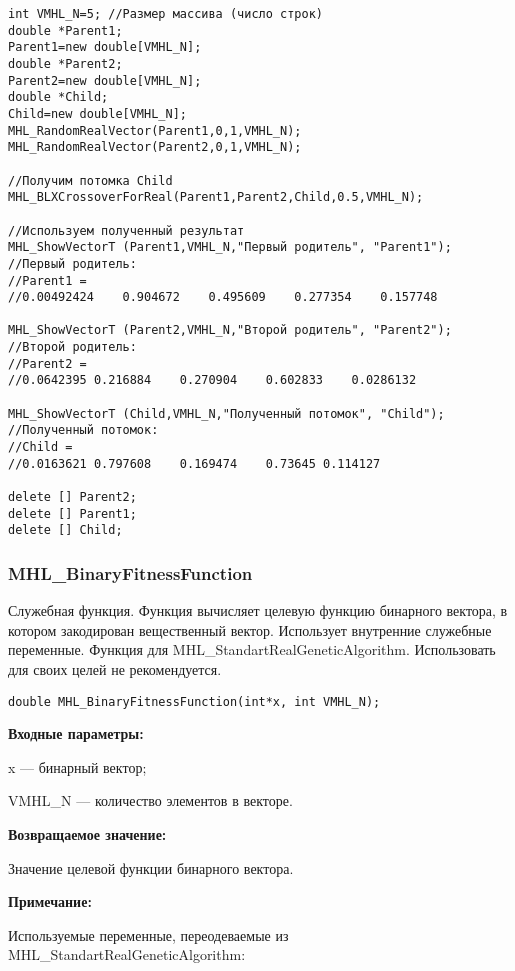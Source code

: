 \documentclass[a4paper,12pt]{article}
\begin{document}
\begin{lstlisting}[label=code_use_MHL_BLXCrossoverForReal,caption=Пример использования]
int VMHL_N=5; //Размер массива (число строк)
double *Parent1;
Parent1=new double[VMHL_N];
double *Parent2;
Parent2=new double[VMHL_N];
double *Child;
Child=new double[VMHL_N];
MHL_RandomRealVector(Parent1,0,1,VMHL_N);
MHL_RandomRealVector(Parent2,0,1,VMHL_N);

//Получим потомка Child
MHL_BLXCrossoverForReal(Parent1,Parent2,Child,0.5,VMHL_N);

//Используем полученный результат
MHL_ShowVectorT (Parent1,VMHL_N,"Первый родитель", "Parent1");
//Первый родитель:
//Parent1 =
//0.00492424	0.904672	0.495609	0.277354	0.157748

MHL_ShowVectorT (Parent2,VMHL_N,"Второй родитель", "Parent2");
//Второй родитель:
//Parent2 =
//0.0642395	0.216884	0.270904	0.602833	0.0286132

MHL_ShowVectorT (Child,VMHL_N,"Полученный потомок", "Child");
//Полученный потомок:
//Child =
//0.0163621	0.797608	0.169474	0.73645	0.114127

delete [] Parent2;
delete [] Parent1;
delete [] Child;
\end{lstlisting}

\subsubsection{MHL\_BinaryFitnessFunction}\label{MHL_BinaryFitnessFunction}

Служебная функция. Функция вычисляет целевую функцию бинарного вектора, в котором закодирован вещественный вектор. Использует внутренние служебные переменные. Функция для MHL\_StandartRealGeneticAlgorithm. Использовать для своих целей не рекомендуется.


\begin{lstlisting}[label=code_syntax_MHL_BinaryFitnessFunction,caption=Синтаксис]
double MHL_BinaryFitnessFunction(int*x, int VMHL_N);
\end{lstlisting}

\textbf{Входные параметры:}
 
x --- бинарный вектор;

 VMHL\_N --- количество элементов в векторе.

\textbf{Возвращаемое значение:} 

Значение целевой функции бинарного вектора.
 
\textbf{Примечание:}

Используемые переменные, переодеваемые из MHL\_StandartRealGeneticAlgorithm:
 
\end{document}
